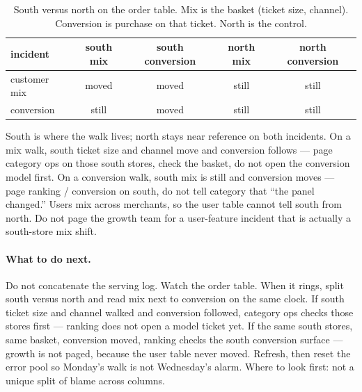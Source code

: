 \documentclass[11pt]{article}
\begin{document}
\begin{table}[H]
\centering
\caption{South versus north on the order table. Mix is the basket (ticket size, channel). Conversion is purchase on that ticket. North is the control.}
\label{tab:where}
\begin{tabular}{lcccc}
\toprule
incident & south mix & south conversion & north mix & north conversion \\
\midrule
customer mix & moved & moved & still & still \\
conversion & still & moved & still & still \\
\bottomrule
\end{tabular}
\end{table}

South is where the walk lives; north stays near reference on both incidents.
On a mix walk, south ticket size and channel move and conversion follows --- page category ops on those south stores, check the basket, do not open the conversion model first.
On a conversion walk, south mix is still and conversion moves --- page ranking / conversion on south, do not tell category that ``the panel changed.''
Users mix across merchants, so the user table cannot tell south from north.
Do not page the growth team for a user-feature incident that is actually a south-store mix shift.

\paragraph{What to do next.}
Do not concatenate the serving log. Watch the order table.
When it rings, split south versus north and read mix next to conversion on the same clock.
If south ticket size and channel walked and conversion followed, category ops checks those stores first --- ranking does not open a model ticket yet.
If the same south stores, same basket, conversion moved, ranking checks the south conversion surface --- growth is not paged, because the user table never moved.
Refresh, then reset the error pool so Monday's walk is not Wednesday's alarm.
Where to look first: not a unique split of blame across columns.
\end{document}
